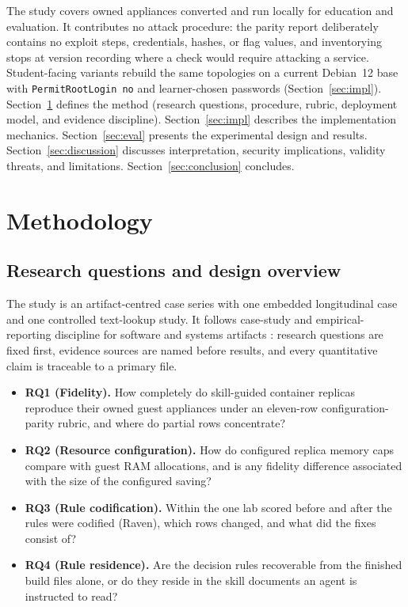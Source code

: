 \documentclass[3p,twocolumn,authoryear]{elsarticle}
\begin{document}
The study covers owned appliances converted and run locally for
education and evaluation. It contributes no attack procedure: the
parity report deliberately contains no exploit steps, credentials,
hashes, or flag values, and inventorying stops at version recording
where a check would require attacking a service. Student-facing
variants rebuild the same topologies on a current Debian~12 base with
\texttt{PermitRootLogin no} and learner-chosen passwords
(Section~\ref{sec:impl}). Section~\ref{sec:method} defines the method
(research questions, procedure, rubric, deployment model, and evidence
discipline). Section~\ref{sec:impl} describes the implementation
mechanics. Section~\ref{sec:eval} presents the experimental design and
results. Section~\ref{sec:discussion} discusses interpretation,
security implications, validity threats, and limitations.
Section~\ref{sec:conclusion} concludes.

\section{Methodology}
\label{sec:method}

\subsection{Research questions and design overview}

The study is an artifact-centred case series with one embedded
longitudinal case and one controlled text-lookup study. It follows
case-study and empirical-reporting discipline for software and systems
artifacts \citep{kitchenham2002, runeson2009, wohlin2012}: research
questions are fixed first, evidence sources are named before results,
and every quantitative claim is traceable to a primary file.

\begin{itemize}
\item \textbf{RQ1 (Fidelity).} How completely do skill-guided container
replicas reproduce their owned guest appliances under an eleven-row
configuration-parity rubric, and where do partial rows concentrate?
\item \textbf{RQ2 (Resource configuration).} How do configured replica
memory caps compare with guest RAM allocations, and is any fidelity
difference associated with the size of the configured saving?
\item \textbf{RQ3 (Rule codification).} Within the one lab scored before
and after the rules were codified (Raven), which rows changed, and what
did the fixes consist of?
\item \textbf{RQ4 (Rule residence).} Are the decision rules recoverable
from the finished build files alone, or do they reside in the skill
documents an agent is instructed to read?
\end{itemize}
\end{document}
